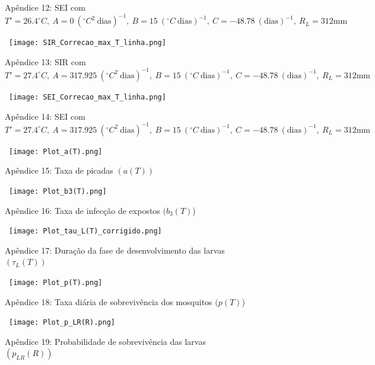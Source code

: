 \documentclass[
	12pt,				%
	oneside,			%
	a4paper,			%
	english,			%
	brazil				%
	]{abntex2}
\begin{document}
\begin{apendicesenv}
\begin{figure}[!ht]
	\caption*{Apêndice 12: SEI com $T'=26.4^\circ C, \ A=0 \ (^\circ C^2 \ \text{dias})^{-1}, \ B=15 \ (^\circ C \ \text{dias})^{-1}, \ C=-48.78 \ (\text{dias})^{-1}, \ R_L=312 \text{mm}$}
\end{figure}
\newpage
\begin{figure}[!ht]
	\centering
	\hbox{\hspace{4.0em} \texttt{[image: SIR\_Correcao\_max\_T\_linha.png]}}
	\caption*{Apêndice 13: SIR com $T'=27.4^\circ C, \ A=317.925 \ (^\circ C^2 \ \text{dias})^{-1}, \ B=15 \ (^\circ C \ \text{dias})^{-1}, \ C=-48.78 \ (\text{dias})^{-1}, \ R_L=312 \text{mm}$}
\end{figure} 
\begin{figure}[!ht]
	\centering
	\hbox{\hspace{3.0em} \texttt{[image: SEI\_Correcao\_max\_T\_linha.png]}}
	\caption*{Apêndice 14: SEI com $T'=27.4^\circ C, \ A=317.925 \ (^\circ C^2 \ \text{dias})^{-1}, \ B=15 \ (^\circ C \ \text{dias})^{-1}, \ C=-48.78 \ (\text{dias})^{-1}, \ R_L=312 \text{mm}$}
\end{figure}
\newpage
\begin{figure}[!ht]
	\centering
	\hbox{\hspace{4.0em} \texttt{[image: Plot\_a(T).png]}}
	\caption*{Apêndice 15: Taxa de picadas $(a(T))$} 
\end{figure} 
\begin{figure}[!ht]
	\centering
	\hbox{\hspace{4.0em} \texttt{[image: Plot\_b3(T).png]}}
	\caption*{Apêndice 16: Taxa de infecção de expostos $(b_3(T)$)} 
\end{figure} 
\newpage
\begin{figure}[!ht]
	\centering
	\hbox{\hspace{2.3em} \texttt{[image: Plot\_tau\_L(T)\_corrigido.png]}}
	\caption*{Apêndice 17: Duração da fase de desenvolvimento das larvas $(\tau_L(T))$} 
\end{figure} 
\begin{figure}[!ht]
	\centering
	\hbox{\hspace{2.5em} \texttt{[image: Plot\_p(T).png]}}
	\caption*{Apêndice 18: Taxa diária de sobrevivência dos mosquitos $(p(T)$)} 
\end{figure} 
\newpage
\begin{figure}[!ht]
	\centering
	\hbox{\hspace{3.0em} \texttt{[image: Plot\_p\_LR(R).png]}}
	\caption*{Apêndice 19: Probabilidade de sobrevivência das larvas $(p_{LR}(R))$} 
\end{figure} 

\end{apendicesenv}
\end{document}

